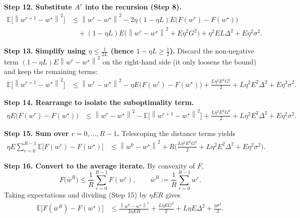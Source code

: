 \documentclass{article}
\newcommand{\E}{\mathbb{E}}
\newcommand{\norm}[1]{\left\lVert#1\right\rVert}
\begin{document}
\noindent\textbf{Step 12.  Substitute $A^{r}$ into the recursion (Step 8).}
\[
\begin{aligned}
    \E\!\big[\norm{w^{r+1}-w^{\star}}^{2}\big]
    &\le
    \norm{w^{r}-w^{\star}}^{2}
    -2\eta(1-\eta L)E\Big(F(w^{r})-F(w^{\star})\Big)   \\
    &\quad
    + (1-\eta L)E\Big(\norm{w^{r}-w^{\star}}^{2}+E\eta^{2}G^{2}\Big)
    +\eta^{2}E L\Delta^{2}
    +E\eta^{2}\sigma^{2}. \tag{Step 12}
\end{aligned}
\]

\noindent\textbf{Step 13.  Simplify using $\eta\le\frac1{2L}$ (hence $1-\eta L\ge\frac12$).}
Discard the non‑negative term $(1-\eta L)E\norm{w^{r}-w^{\star}}^{2}$ on the right‑hand side (it only loosens the bound) and keep the remaining terms:
\[
\begin{aligned}
    \E\!\big[\norm{w^{r+1}-w^{\star}}^{2}\big]
    &\le
    \norm{w^{r}-w^{\star}}^{2}
    -\eta E\big(F(w^{r})-F(w^{\star})\big)
    +\frac{L\eta^{2}E^{2}G^{2}}{2}
    +L\eta^{2}E^{2}\Delta^{2}
    +E\eta^{2}\sigma^{2}. \tag{Step 13}
\end{aligned}
\]

\noindent\textbf{Step 14.  Rearrange to isolate the suboptimality term.}
\[
\begin{aligned}
    \eta E\big(F(w^{r})-F(w^{\star})\big)
    &\le
    \norm{w^{r}-w^{\star}}^{2}
    -\E\!\big[\norm{w^{r+1}-w^{\star}}^{2}\big]
    +\frac{L\eta^{2}E^{2}G^{2}}{2}
    +L\eta^{2}E^{2}\Delta^{2}
    +E\eta^{2}\sigma^{2}. \tag{Step 14}
\end{aligned}
\]

\noindent\textbf{Step 15.  Sum over $r=0,\dots,R-1$.}  Telescoping the distance terms yields
\[
\begin{aligned}
    \eta E\!\sum_{r=0}^{R-1}\E\!\big[F(w^{r})-F(w^{\star})\big]
    &\le
    \norm{w^{0}-w^{\star}}^{2}
    +R\Big(\tfrac{L\eta^{2}E^{2}G^{2}}{2}+L\eta^{2}E^{2}\Delta^{2}+E\eta^{2}\sigma^{2}\Big). \tag{Step 15}
\end{aligned}
\]

\noindent\textbf{Step 16.  Convert to the average iterate.}  By convexity of $F$,
\[
    F\!\big(\bar w^{R}\big)\le\frac1R\sum_{r=0}^{R-1}F(w^{r}),\qquad
    \bar w^{R}:=\frac1R\sum_{r=0}^{R-1}w^{r}.
\]
Taking expectations and dividing (Step 15) by $\eta E R$ gives
\[
\begin{aligned}
    \E\!\big[F(\bar w^{R})-F(w^{\star})\big]
    &\le
    \frac{\norm{w^{0}-w^{\star}}^{2}}{2\eta ER}
    +\frac{L\eta EG^{2}}{2}
    +L\eta E\Delta^{2}
    +\frac{\eta\sigma^{2}}{2}. \tag{Step 16}
\end{aligned}
\]
\end{document}
